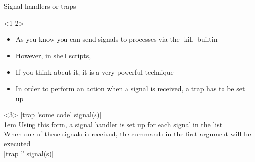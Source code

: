 \begin{frame}{Signal handlers or traps}
    \begin{onlyenv}<1-2>
        \begin{itemize}
            \item As you know you can send signals to processes via the \bash|kill| builtin
            \item However, in shell scripts, 
            \item If you think about it, it is a very powerful technique
            \item In order to perform an action when a signal is received, a trap has to be set up
        \end{itemize}
        \smallskip
        \begin{center}
        \end{center}
    \end{onlyenv}
    \begin{onlyenv}<3>
        \medskip
        \colorbox{background-color}{\bash|trap 'some code' signal(s)|}\\[0.3em]
        \begingroup\leftskip1em
            Using this form, a signal handler is set up for each signal in the list\\
            When one of these signals is received, the commands in the first argument will be executed\\[0.4em]
        \endgroup
        \colorbox{background-color}{\bash|trap '' signal(s)|}\\[0.3em]

\end{onlyenv}
\end{frame}
